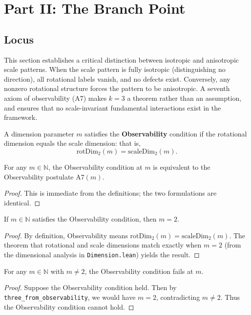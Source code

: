 \section{Part II: The Branch Point}

\subsection{Locus}

This section establishes a critical distinction between isotropic and anisotropic scale patterns. When the scale pattern is fully isotropic (distinguishing no direction), all rotational labels vanish, and no defects exist. Conversely, any nonzero rotational structure forces the pattern to be anisotropic. A seventh axiom of observability (A7) makes $k = 3$ a theorem rather than an assumption, and ensures that no scale-invariant fundamental interactions exist in the framework.

\begin{definition}
A dimension parameter $m$ satisfies the \textbf{Observability} condition if the rotational dimension equals the scale dimension: that is,
\[
\text{rotDim}_2(m) = \text{scaleDim}_2(m).
\]
\end{definition}

\begin{theorem}
For any $m \in \mathbb{N}$, the Observability condition at $m$ is equivalent to the Observability postulate $\text{A7}(m)$.
\begin{proof}
This is immediate from the definitions; the two formulations are identical.
\end{proof}
\end{theorem}

\begin{theorem}
If $m \in \mathbb{N}$ satisfies the Observability condition, then $m = 2$.
\begin{proof}
By definition, Observability means $\text{rotDim}_2(m) = \text{scaleDim}_2(m)$. The theorem that rotational and scale dimensions match exactly when $m = 2$ (from the dimensional analysis in \texttt{Dimension.lean}) yields the result.
\end{proof}
\end{theorem}

\begin{theorem}
For any $m \in \mathbb{N}$ with $m \neq 2$, the Observability condition fails at $m$.
\begin{proof}
Suppose the Observability condition held. Then by \texttt{three\_from\_observability}, we would have $m = 2$, contradicting $m \neq 2$. Thus the Observability condition cannot hold.
\end{proof}
\end{theorem}

